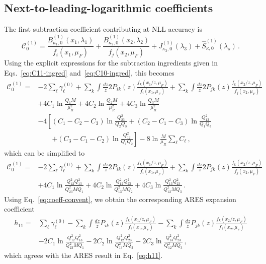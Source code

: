 \subsection{Next-to-leading-logarithmic coefficients}
\label{subsec:NLL-coeff}

The first subtraction coefficient contributing at NLL accuracy is
\begin{equation}
\label{eq:C10}
    \mathcal{C}_0^{(1)}=\frac{B_{\kappa_1,0}^{(1)}(x_1,\lambda_1)}{f_i(x_1,\mu_F)}+\frac{B_{\kappa_2,0}^{(1)}(x_2,\lambda_2)}{f_j(x_2,\mu_F)}+
    J_{\kappa_3,0}^{(1)}(\lambda_3)
    +\widehat{S}^{(1)}_{\kappa,0}\left(\lambda_s\right)\,.
\end{equation}
Using the explicit expressions for the subtraction ingredients given in
Eqs.~\eqref{eq:C11-ingred} and~\eqref{eq:C10-ingred}, this becomes
\begin{equation}
\label{eq:C10-init}
    \begin{aligned}
    \mathcal{C}^{(1)}_0={}&-2\sum_{\ell} \gamma_{\ell}^{(0)}
    +\sum_{k}\int\frac{dz}{z}2P_{ik}(z)\frac{f_k(x_1/z,\mu_F)}{f_i(x_1,\mu_F)}
    +\sum_{k}\int\frac{dz}{z}2P_{jk}(z)\frac{f_k(x_2/z,\mu_F)}{f_j(x_2,\mu_F)}\\
    &+4C_1\ln\frac{Q_1 M}{\mu_R^2}+4C_2\ln\frac{Q_2 M}{\mu_R^2}
    +4C_3\ln\frac{Q_3 M}{\mu_R^2} \\
        &-4\left[(C_1-C_2-C_3)\ln\frac{Q_{23}^2}{Q_2 Q_3}
    +(C_2-C_1-C_3)\ln\frac{Q_{13}^2}{Q_1 Q_3}\right.\\
    &\qquad\left.+(C_3-C_1-C_2)\ln\frac{Q_{12}^2}{Q_1 Q_2}\right]-8\ln\frac{M}{\mu_R}\sum_{\ell}C_{\ell}\,,
    \end{aligned}
\end{equation}
which can be simplified to
\begin{equation}
\label{eq:C01-simplified}
    \begin{aligned}
    \mathcal{C}^{(1)}_0={}&-2\sum_{\ell} \gamma_{\ell}^{(0)}
    +\sum_{k}\int\frac{dz}{z}2P_{ik}(z)\frac{f_k(x_1/z,\mu_F)}{f_i(x_1,\mu_F)}
    +\sum_{k}\int\frac{dz}{z}2P_{jk}(z)\frac{f_k(x_2/z,\mu_F)}{f_j(x_2,\mu_F)}\\
    &+4C_1\ln\frac{Q_{12}^2 Q_{13}^2}{Q_{23}^2 MQ_1}
    +4C_2\ln\frac{Q_{12}^2 Q_{23}^2}{Q_{13}^2 MQ_2}
    +4C_3\ln\frac{Q_{13}^2 Q_{23}^2}{Q_{12}^2 MQ_3}\,.
    \end{aligned}
\end{equation}
Using Eq.~\eqref{eq:coeff-convent}, we obtain the corresponding
\textsc{ARES} expansion coefficient
\begin{equation}
\label{eq:SCET-h11}
    \begin{aligned}
    h_{11}=&\sum_{\ell}\gamma^{(0)}_{\ell}
    -\sum_{k}\int\frac{dz}{z}P_{ik}(z)\frac{f_k(x_1/z,\mu_F)}{f_i(x_1,\mu_F)}
    -\sum_{k}\int\frac{dz}{z}P_{jk}(z)\frac{f_k(x_2/z,\mu_F)}{f_j(x_2,\mu_F)}\\
    &-2C_1\ln\frac{Q_{12}^2 Q_{13}^2}{Q_{23}^2 MQ_1}
    -2C_2\ln\frac{Q_{12}^2 Q_{23}^2}{Q_{13}^2 MQ_2}
    -2C_3\ln\frac{Q_{13}^2 Q_{23}^2}{Q_{12}^2 MQ_3}\,,
    \end{aligned}
\end{equation}
which agrees with the \textsc{ARES} result in Eq.~\eqref{eq:h11}.

